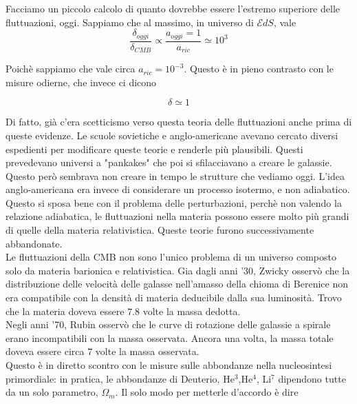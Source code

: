 \documentclass{report}
\begin{document}
Facciamo un piccolo calcolo di quanto dovrebbe essere l'estremo superiore delle fluttuazioni, oggi. Sappiamo che al massimo, in universo di $\mathcal{E}dS$, vale 
\begin{equation}
    \frac{\delta_{oggi}}{\delta_{CMB}} \propto \frac{a_{oggi} = 1}{a_{ric}} \simeq 10^{3}
\end{equation}

Poichè sappiamo che vale circa $a_{ric} = 10^{-3}$. Questo è in pieno contrasto con le misure odierne, che invece ci dicono 

\begin{equation}
    \delta \simeq 1
\end{equation}

Di fatto, già c'era scetticismo verso questa teoria delle fluttuazioni anche prima di queste evidenze. Le scuole sovietiche e anglo-americane avevano cercato diversi espedienti per modificare queste teorie e renderle più plausibili. Questi prevedevano universi a "pankakes" che poi si sfilacciavano a creare le galassie. Questo però sembrava non creare in tempo le strutture che vediamo oggi. L'idea anglo-americana era invece di considerare un processo isotermo, e non adiabatico. Questo si sposa bene con il problema delle perturbazioni, perchè non valendo la relazione adiabatica, le fluttuazioni nella materia possono essere molto più grandi di quelle della materia relativistica. Queste teorie furono successivamente abbandonate. \\

Le fluttuazioni della CMB non sono l'unico problema di un universo composto solo da materia barionica e relativistica. Gia dagli anni '30, Zwicky osservò che la distribuzione delle velocità delle galasse nell'amasso della chioma di Berenice non era compatibile con la densità di materia deducibile dalla sua luminosità. Trovo che la materia doveva essere $7.8$ volte la massa dedotta. \\

Negli anni '70, Rubin osservò che le curve di rotazione delle galassie a spirale erano incompatibili con la massa osservata. Ancora una volta, la massa totale doveva essere circa $7$ volte la massa osservata. \\

Questo è in diretto scontro con le misure sulle abbondanze nella nucleosintesi primordiale: in pratica, le abbondanze di Deuterio, He$^3$,He$^4$, Li$^7$ dipendono tutte da un solo parametro, $\Omega_m$. Il solo modo per metterle d'accordo è dire 
\end{document}
